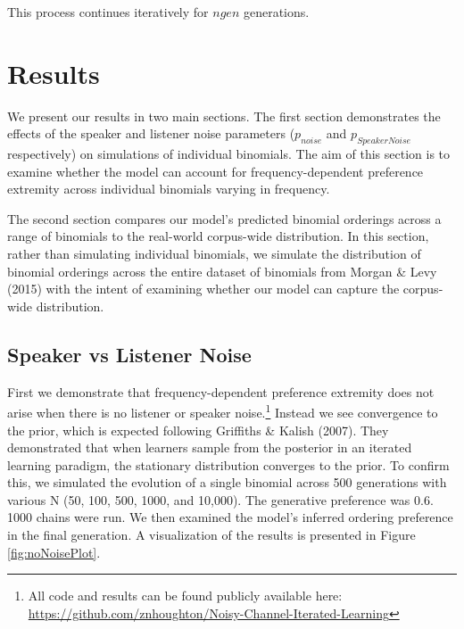 \documentclass[10pt, letterpaper, hidelinks]{article}
\begin{document}
This process continues iteratively for \(ngen\) generations.

\hypertarget{results}{%
\section{Results}\label{results}}

We present our results in two main sections. The first section
demonstrates the effects of the speaker and listener noise parameters
(\(p_{noise}\) and \(p_{SpeakerNoise}\) respectively) on simulations of
individual binomials. The aim of this section is to examine whether the
model can account for frequency-dependent preference extremity across
individual binomials varying in frequency.

The second section compares our model's predicted binomial orderings
across a range of binomials to the real-world corpus-wide distribution.
In this section, rather than simulating individual binomials, we
simulate the distribution of binomial orderings across the entire
dataset of binomials from Morgan \& Levy (2015) with the intent of
examining whether our model can capture the corpus-wide distribution.

\hypertarget{speaker-vs-listener-noise}{%
\subsection{Speaker vs Listener Noise}\label{speaker-vs-listener-noise}}

First we demonstrate that frequency-dependent preference extremity does
not arise when there is no listener or speaker noise.\footnote{All code
  and results can be found publicly available here:
  \url{https://github.com/znhoughton/Noisy-Channel-Iterated-Learning}}
Instead we see convergence to the prior, which is expected following
Griffiths \& Kalish (2007). They demonstrated that when learners sample
from the posterior in an iterated learning paradigm, the stationary
distribution converges to the prior. To confirm this, we simulated the
evolution of a single binomial across 500 generations with various N
(50, 100, 500, 1000, and 10,000). The generative preference was 0.6.
1000 chains were run. We then examined the model's inferred ordering
preference in the final generation. A visualization of the results is
presented in Figure \ref{fig:noNoisePlot}.
\end{document}
